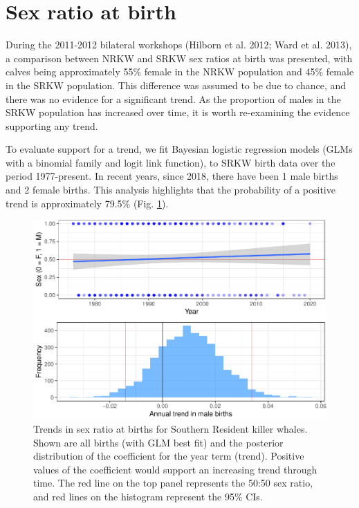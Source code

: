 \documentclass[]{article}
\begin{document}
\hypertarget{sex-ratio-at-birth}{%
\section{Sex ratio at birth}\label{sex-ratio-at-birth}}

During the 2011-2012 bilateral workshops (Hilborn et al. 2012; Ward et
al. 2013), a comparison between NRKW and SRKW sex ratios at birth was
presented, with calves being approximately 55\% female in the NRKW
population and 45\% female in the SRKW population. This difference was
assumed to be due to chance, and there was no evidence for a significant
trend. As the proportion of males in the SRKW population has increased
over time, it is worth re-examining the evidence supporting any trend.

To evaluate support for a trend, we fit Bayesian logistic regression
models (GLMs with a binomial family and logit link function), to SRKW
birth data over the period 1977-present. In recent years, since 2018,
there have been 1 male births and 2 female births. This analysis
highlights that the probability of a positive trend is approximately
79.5\% (Fig. \ref{fig:srb}).

\begin{figure}
\centering
\includegraphics{status_update_files/figure-latex/unnamed-chunk-4-1.pdf}
\caption{Trends in sex ratio at births for Southern Resident killer
whales. Shown are all births (with GLM best fit) and the posterior
distribution of the coefficient for the year term (trend). Positive
values of the coefficient would support an increasing trend through
time. The red line on the top panel represents the 50:50 sex ratio, and
red lines on the histogram represent the 95\% CIs. \label{fig:srb}}
\end{figure}
\end{document}

